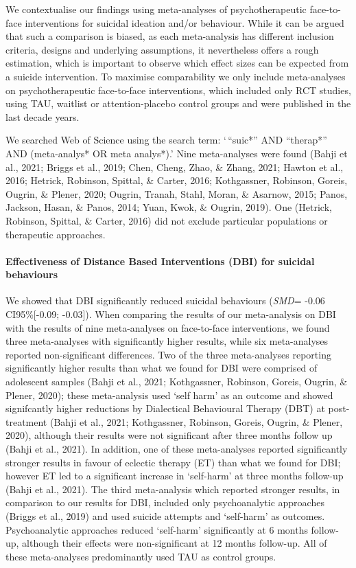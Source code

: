 \documentclass[
  english,
  man]{apa6}
\let\oldparagraph\paragraph
\renewcommand{\paragraph}[1]{\oldparagraph{#1}\mbox{}}
\begin{document}
We contextualise our findings using meta-analyses of psychotherapeutic face-to-face interventions for suicidal ideation and/or behaviour. While it can be argued that such a comparison is biased, as each meta-analysis has different inclusion criteria, designs and underlying assumptions, it nevertheless offers a rough estimation, which is important to observe which effect sizes can be expected from a suicide intervention. To maximise comparability we only include meta-analyses on psychotherapeutic face-to-face interventions, which included only RCT studies, using TAU, waitlist or attention-placebo control groups and were published in the last decade years.

We searched Web of Science using the search term: `\,``suic*'' AND ``therap*'' AND (meta-analys* OR meta analys*).' Nine meta-analyses were found (Bahji et al., 2021; Briggs et al., 2019; Chen, Cheng, Zhao, \& Zhang, 2021; Hawton et al., 2016; Hetrick, Robinson, Spittal, \& Carter, 2016; Kothgassner, Robinson, Goreis, Ougrin, \& Plener, 2020; Ougrin, Tranah, Stahl, Moran, \& Asarnow, 2015; Panos, Jackson, Hasan, \& Panos, 2014; Yuan, Kwok, \& Ougrin, 2019). One (Hetrick, Robinson, Spittal, \& Carter, 2016) did not exclude particular populations or therapeutic approaches.

\hypertarget{effectiveness-of-distance-based-interventions-dbi-for-suicidal-behaviours}{%
\paragraph{Effectiveness of Distance Based Interventions (DBI) for suicidal behaviours}\label{effectiveness-of-distance-based-interventions-dbi-for-suicidal-behaviours}}

We showed that DBI significantly reduced suicidal behaviours (\emph{SMD}= -0.06 CI95\%{[}-0.09; -0.03{]}). When comparing the results of our meta-analysis on DBI with the results of nine meta-analyses on face-to-face interventions, we found three meta-analyses with significantly higher results, while six meta-analyses reported non-significant differences. Two of the three meta-analyses reporting significantly higher results than what we found for DBI were comprised of adolescent samples (Bahji et al., 2021; Kothgassner, Robinson, Goreis, Ougrin, \& Plener, 2020); these meta-analysis used `self harm' as an outcome and showed signifcantly higher reductions by Dialectical Behavioural Therapy (DBT) at post-treatment (Bahji et al., 2021; Kothgassner, Robinson, Goreis, Ougrin, \& Plener, 2020), although their results were not significant after three months follow up (Bahji et al., 2021). In addition, one of these meta-analyses reported significantly stronger results in favour of eclectic therapy (ET) than what we found for DBI; however ET led to a significant increase in `self-harm' at three months follow-up (Bahji et al., 2021). The third meta-analysis which reported stronger results, in comparison to our results for DBI, included only psychoanalytic approaches (Briggs et al., 2019) and used suicide attempts and `self-harm' as outcomes. Psychoanalytic approaches reduced `self-harm' significantly at 6 months follow-up, although their effects were non-significant at 12 months follow-up. All of these meta-analyses predominantly used TAU as control groups.
\end{document}

